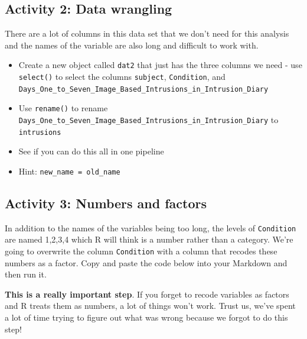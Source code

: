 \documentclass[]{book}
\newenvironment{Shaded}{\begin{snugshade}}{\end{snugshade}}
\newcommand{\DataTypeTok}[1]{\textcolor[rgb]{0.13,0.29,0.53}{#1}}
\newcommand{\KeywordTok}[1]{\textcolor[rgb]{0.13,0.29,0.53}{\textbf{#1}}}
\newcommand{\NormalTok}[1]{#1}
\newcommand{\OperatorTok}[1]{\textcolor[rgb]{0.81,0.36,0.00}{\textbf{#1}}}
\newcommand{\StringTok}[1]{\textcolor[rgb]{0.31,0.60,0.02}{#1}}
\providecommand{\tightlist}{%
  \setlength{\itemsep}{0pt}\setlength{\parskip}{0pt}}
\begin{document}
\hypertarget{activity-2-data-wrangling}{%
\subsection{Activity 2: Data wrangling}\label{activity-2-data-wrangling}}

There are a lot of columns in this data set that we don't need for this analysis and the names of the variable are also long and difficult to work with.

\begin{itemize}
\tightlist
\item
  Create a new object called \texttt{dat2} that just has the three columns we need - use \texttt{select()} to select the columns \texttt{subject}, \texttt{Condition}, and \texttt{Days\_One\_to\_Seven\_Image\_Based\_Intrusions\_in\_Intrusion\_Diary}
\item
  Use \texttt{rename()} to rename \texttt{Days\_One\_to\_Seven\_Image\_Based\_Intrusions\_in\_Intrusion\_Diary} to \texttt{intrusions}
\item
  See if you can do this all in one pipeline
\item
  Hint: \texttt{new\_name\ =\ old\_name}
\end{itemize}

\hypertarget{activity-3-numbers-and-factors}{%
\subsection{Activity 3: Numbers and factors}\label{activity-3-numbers-and-factors}}

In addition to the names of the variables being too long, the levels of \texttt{Condition} are named 1,2,3,4 which R will think is a number rather than a category. We're going to overwrite the column \texttt{Condition} with a column that recodes these numbers as a factor. Copy and paste the code below into your Markdown and then run it.

\begin{Shaded}
\end{Shaded}

\textbf{This is a really important step}. If you forget to recode variables as factors and R treats them as numbers, a lot of things won't work. Trust us, we've spent a lot of time trying to figure out what was wrong because we forgot to do this step!
\end{document}

